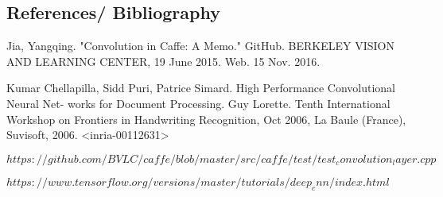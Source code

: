 \documentclass[a4paper]{article}
\begin{document}
\begin{doublespace}
\section{References/ Bibliography}
\begin{hangparas}{.25in}{1}
Jia, Yangqing. "Convolution in Caffe: A Memo." GitHub. BERKELEY VISION AND LEARNING CENTER, 19 June 2015. Web. 15 Nov. 2016.

Kumar Chellapilla, Sidd Puri, Patrice Simard. High Performance Convolutional Neural Net- works for Document Processing. Guy Lorette. Tenth International Workshop on Frontiers in Handwriting Recognition, Oct 2006, La Baule (France), Suvisoft, 2006. <inria-00112631>

$https://github.com/BVLC/caffe/blob/master/src/caffe/test/test_convolution_layer.cpp$ 

$https://www.tensorflow.org/versions/master/tutorials/deep_cnn/index.html$ 
\end{hangparas}
\end{doublespace}
\end{document}
